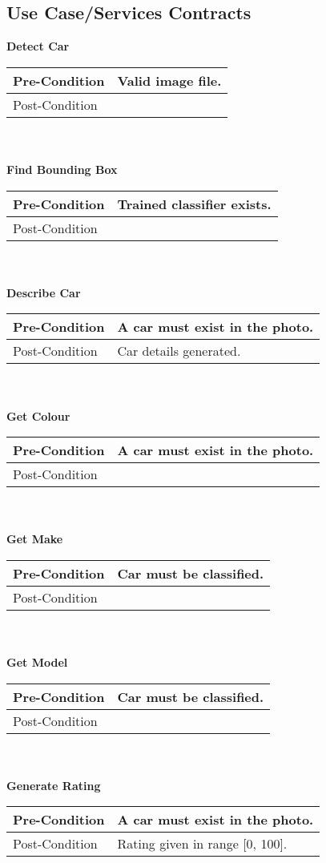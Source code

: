 \subsection{Use Case/Services Contracts}
\textbf{Detect Car} \\
\begin{tabular}{| l | l |}
	\hline
	Pre-Condition & Valid image file. \\
	\hline
	Post-Condition & \\
	\hline
\end{tabular}
\\
\\
\textbf{Find Bounding Box} \\
\begin{tabular}{| l | l |}
	\hline
	Pre-Condition & Trained classifier exists.\\
	\hline
	Post-Condition & \\
	\hline
\end{tabular}
\\
\\
\textbf{Describe Car} \\
\begin{tabular}{| l | l |}
	\hline
	Pre-Condition & A car must exist in the photo.\\
	\hline
	Post-Condition & Car details generated.\\
	\hline
\end{tabular}
\\
\\
\textbf{Get Colour} \\
\begin{tabular}{| l | l |}
	\hline
	Pre-Condition & A car must exist in the photo.\\
	\hline
	Post-Condition & \\
	\hline
\end{tabular}
\\
\\
\textbf{Get Make} \\
\begin{tabular}{| l | l |}
	\hline
	Pre-Condition & Car must be classified.\\
	\hline
	Post-Condition & \\
	\hline
\end{tabular}
\\
\\
\textbf{Get Model} \\
\begin{tabular}{| l | l |}
	\hline
	Pre-Condition & Car must be classified.\\
	\hline
	Post-Condition & \\
	\hline
\end{tabular}
\\
\\
\textbf{Generate Rating}  \\
\begin{tabular}{| l | l |}
	\hline
	Pre-Condition & A car must exist in the photo.\\
	\hline
	Post-Condition & Rating given in range [0, 100].\\
	\hline
\end{tabular}
\\
\\
